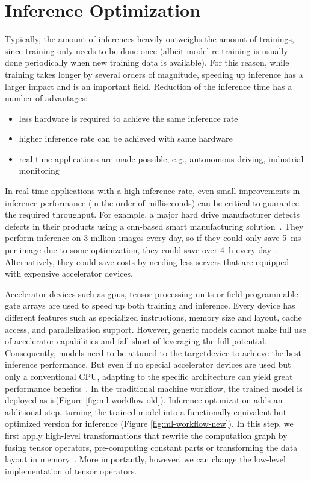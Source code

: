 \section{Inference Optimization}
Typically, the amount of inferences heavily outweighs the amount of trainings, since training only needs to be done once (albeit model re-training is usually done periodically when new training data is available). For this reason, while training takes longer by several orders of magnitude, speeding up inference has a larger impact and is an important field. 
Reduction of the inference time has a number of advantages:
\begin{itemize}
	\item less hardware is required to achieve the same inference rate
	\item higher inference rate can be achieved with same hardware
	\item real-time applications are made possible, e.g., autonomous driving, industrial monitoring
\end{itemize}
In real-time applications with a high inference rate, even small improvements in inference performance (in the order of milliseconds) can be critical to guarantee the required throughput.
For example, a major hard drive manufacturer detects defects in their products using a \gls{cnn}-based smart manufacturing solution~\cite[p.~11]{LyveDataLabs.2019}. They perform inference on 3 million images every day, so if they could only save \SI{5}{\milli\second} per image due to some optimization, they could save over \SI{4}{\hour} every day~\cite{Seagate.2019}. Alternatively, they could save costs by needing less servers that are equipped with expensive accelerator devices.

Accelerator devices such as \glspl{gpu}, tensor processing units or field-programmable gate arrays are used to speed up both training and inference. Every device has different features such as specialized instructions, memory size and layout, cache access, and parallelization support. However, generic models cannot make full use of accelerator capabilities and fall short of leveraging the full potential. Consequently, models need to be attuned to the \gls{targetdevice} to achieve the best inference performance. But even if no special accelerator devices are used but only a conventional CPU, adapting to the specific architecture can yield great performance benefits~\cite[p.~1]{Liu.2019}. In the traditional machine workflow, the trained model is deployed as-is(Figure \ref{fig:ml-workflow-old}). Inference optimization adds an additional step, turning the trained model into a functionally equivalent but optimized version for inference (Figure \ref{fig:ml-workflow-new}). In this step, we first apply high-level transformations that rewrite the computation graph by fusing tensor operators, pre-computing constant parts or transforming the data layout in memory~\cites[p.~1--3]{Chen.2018b}. More importantly, however, we can change the low-level implementation of tensor operators.

